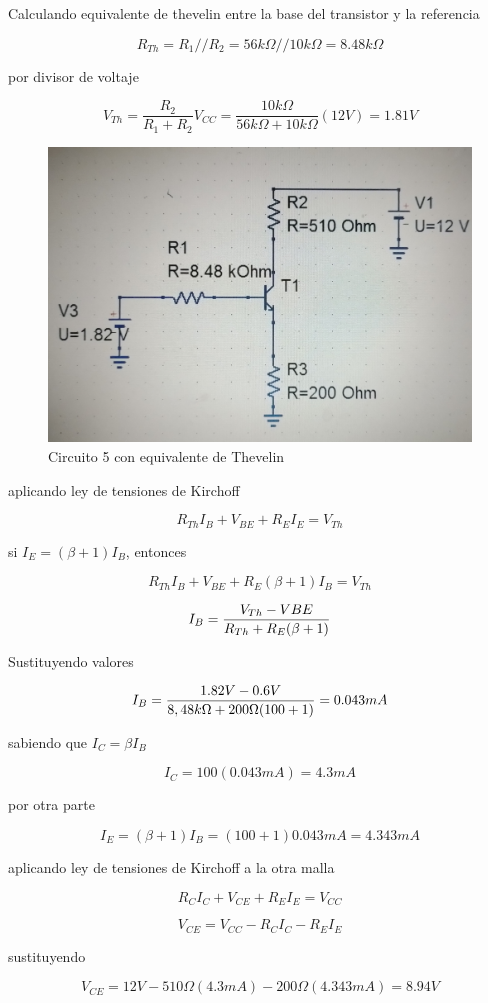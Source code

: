 \documentclass[10pt, a4paper]{article}
\begin{document}
    Calculando equivalente de thevelin entre la base del transistor y la referencia

    $$R_{Th} = R_1 // R_2 = 56k\Omega // 10k\Omega = 8.48k\Omega$$
    
    por divisor de voltaje

    $$V_{Th} = \frac{R_2}{R_1 + R_2} V_{CC} = \frac{10k\Omega}{56k\Omega + 10k\Omega} (12V) = 1.81V$$

    \begin{figure}[h!]
        \centering
        \includegraphics[height=5cm\textwidth]{thevelin5.jpg} \par
        \caption{\label{fig:13} Circuito 5 con equivalente de Thevelin}
    \end{figure}

    aplicando ley de tensiones de Kirchoff

    $$R_{Th}I_B + V_{BE} + R_EI_E = V_{Th}$$

    si $I_E = (\beta + 1)I_B$, entonces

    $$R_{Th}I_B + V_{BE} + R_E(\beta + 1)I_B = V_{Th}$$

    $$I_B = {V_{Th} - V{BE} \over R_{Th} + R_E(\beta + 1)}$$

    Sustituyendo valores

    $$I_B = {1.82V - 0.6V \over 8,48k\Omega + 200\Omega(100 + 1)} = 0.043mA$$

    sabiendo que $I_C = \beta I_B$

    $$I_C = 100(0.043mA) = 4.3mA$$

    por otra parte

    $$I_E = (\beta + 1)I_B = (100 + 1)0.043mA = 4.343mA$$

    aplicando ley de tensiones de Kirchoff a la otra malla

    $$R_{C}I_C + V_{CE} + R_EI_E = V_{CC}$$

    $$V_{CE} = V_{CC} - R_{C}I_C - R_EI_E$$

    sustituyendo

    $$V_{CE} = 12V - 510\Omega (4.3mA) - 200\Omega (4.343mA) = 8.94V$$
\end{document}
